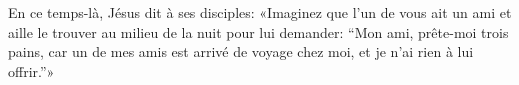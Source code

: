 En ce temps-là, Jésus dit à ses disciples:
	«Imaginez que l’un de vous ait un ami
	et aille le trouver au milieu de la nuit pour lui demander:
	“Mon ami, prête-moi trois pains,
	car un de mes amis est arrivé de voyage chez moi,
	et je n’ai rien à lui offrir.”»
